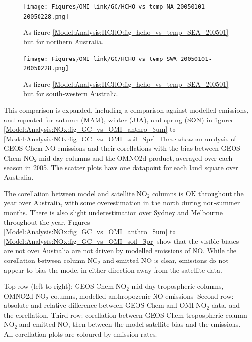     \begin{figure}
      \texttt{[image: Figures/OMI\_link/GC/HCHO\_vs\_temp\_NA\_20050101-20050228.png]}
      \caption{%
        As figure \ref{Model:Analysis:HCHO:fig_hcho_vs_temp_SEA_200501} but for northern Australia.
      }
      \label{Model:Analysis:HCHO:fig_hcho_vs_temp_NA_200501}
    \end{figure}
    
    \begin{figure}
      \texttt{[image: Figures/OMI\_link/GC/HCHO\_vs\_temp\_SWA\_20050101-20050228.png]}
      \caption{%
        As figure \ref{Model:Analysis:HCHO:fig_hcho_vs_temp_SEA_200501} but for south-western Australia.
      }
      \label{Model:Analysis:HCHO:fig_hcho_vs_temp_SWA_200501}
    \end{figure}
    
    This comparison is expanded, including a comparison against modelled emissions, and repeated for autumn (MAM), winter (JJA), and spring (SON) in figures \ref{Model:Analysis:NOx:fig_GC_vs_OMI_anthro_Sum} to \ref{Model:Analysis:NOx:fig_GC_vs_OMI_soil_Spr}.
    These show an analysis of GEOS-Chem NO emissions and their corellations with the bias between GEOS-Chem NO$_2$ mid-day columns and the OMNO2d product, averaged over each season in 2005.
    The scatter plots have one datapoint for each land square over Australia.
    
    The corellation between model and satellite NO$_2$ columns is OK throughout the year over Australia, with some overestimation in the north during non-summer months.
    There is also slight underestimation over Sydney and Melbourne throughout the year.
    Figures \ref{Model:Analysis:NOx:fig_GC_vs_OMI_anthro_Sum} to \ref{Model:Analysis:NOx:fig_GC_vs_OMI_soil_Spr} show that the visible biases are not over Australia are not driven by modelled emissions of NO.
    While the corellation between column NO$_2$ and emitted NO is clear, emissions do not appear to bias the model in either direction away from the satellite data.

    
      {
        Top row (left to right): GEOS-Chem NO$_2$ mid-day tropospheric columns, OMNO2d NO$_2$ columns, modelled anthropogenic NO emissions. 
        Second row: absolute and relative difference between GEOS-Chem and OMI NO$_2$ data, and the corellation.
        Third row: corellation between GEOS-Chem tropospheric column NO$_2$ and emitted NO, then between the model-satellite bias and the emissions.
        All corellation plots are coloured by emission rates.
      }
      {\label{Model:Analysis:NOx:fig_GC_vs_OMI_anthro_Sum}}
    
